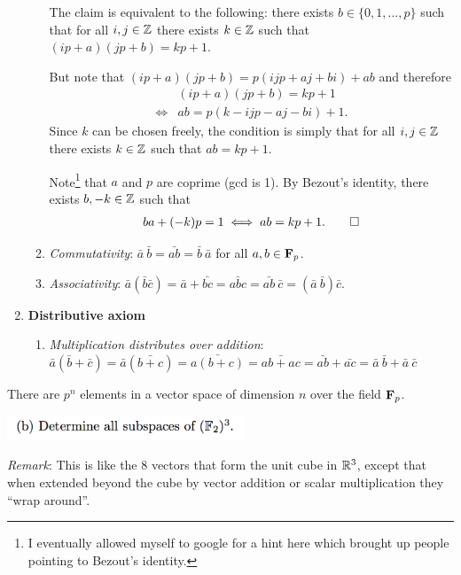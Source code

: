 \begin{enumerate}
\begin{enumerate}
    The claim is equivalent to the following: there exists
    $b \in \{0, 1, \ldots, p\}$ such that for all $i, j \in \mathbb{Z}$ there exists
    $k \in \mathbb{Z}$ such that $(ip + a)(jp + b) = kp + 1$.

    But note that $(ip + a)(jp + b) = p(ijp + aj + bi) + ab$ and therefore
    \begin{align*}
      &(ip + a)(jp + b) = kp + 1\\
      \iff &ab = p(k - ijp - aj - bi) + 1.
    \end{align*}
    Since $k$ can be chosen freely, the condition is simply that for all
    $i, j \in \mathbb{Z}$ there exists $k \in \mathbb{Z}$ such that $ab = kp + 1$.

    Note\footnote{I eventually allowed myself to google for a hint here which
      brought up people pointing to Bezout's identity.} that $a$ and $p$ are
    coprime (gcd is 1). By Bezout's identity, there exists $b, -k \in \mathbb{Z}$
    such that
    \begin{align*}
      ba + (-k)p = 1 \iff ab = kp + 1. \qed
    \end{align*}


  \item \textit{Commutativity}:
    $\bar a ~ \bar b = \bar{ab} = \bar{b} ~ \bar{a}$ for all $a, b \in \mathbf{F}_p$.
  \item \textit{Associativity}:
    $\bar a (\bar b \bar c) = \bar a + \bar {bc} = \bar{abc} =
    \bar{ab}~\bar{c} = (\bar a ~ \bar b) \bar{c}$.
  \end{enumerate}
\item \textbf{Distributive axiom}
  \begin{enumerate}
  \item \textit{Multiplication distributes over addition}: $\bar a (\bar b + \bar c) = \bar a (\bar{b + c}) = \bar{a(b+c)} = \bar{ab +
      ac} = \bar{ab} + \bar{ac} = \bar{a}~\bar{b} + \bar{a}~\bar{c}$
  \end{enumerate}
\end{enumerate}

There are $p^n$ elements in a vector space of dimension $n$ over the field $\mathbf{F}_p$.
\newpage
\begin{mdframed}
  \includegraphics[width=200pt]{img/linear-algebra-a0-1-1-b.png}
\end{mdframed}

\textit{Remark}: This is like the 8 vectors that form the unit cube in
$\mathbb{R}^3$, except that when extended beyond the cube by vector addition or
scalar multiplication they ``wrap around''.

